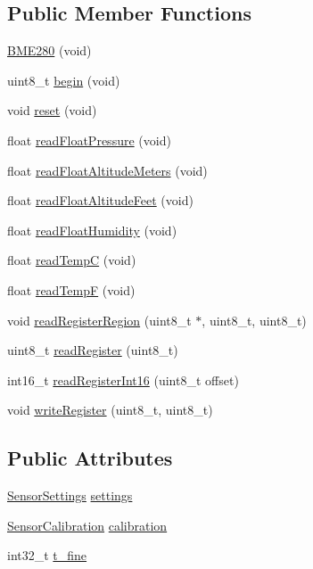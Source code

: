 \subsection*{Public Member Functions}
\begin{DoxyCompactItemize}
\item 
\hyperlink{class_b_m_e280_a9b9354e010528a0c3d452aa2459b808c}{B\+M\+E280} (void)
\item 
uint8\+\_\+t \hyperlink{class_b_m_e280_a994c102f010547f9c740a338ef9905c7}{begin} (void)
\item 
void \hyperlink{class_b_m_e280_aeec5deb6daace6ae390108b4210e9df7}{reset} (void)
\item 
float \hyperlink{class_b_m_e280_ada6e799917afb4f228e6253bc56ffe75}{read\+Float\+Pressure} (void)
\item 
float \hyperlink{class_b_m_e280_af67b56ba50760ee1d116acc6c5010221}{read\+Float\+Altitude\+Meters} (void)
\item 
float \hyperlink{class_b_m_e280_a6525c8a26f887b52596c86bed99343cb}{read\+Float\+Altitude\+Feet} (void)
\item 
float \hyperlink{class_b_m_e280_a42ea7232039eebf5aadb391ef6132c35}{read\+Float\+Humidity} (void)
\item 
float \hyperlink{class_b_m_e280_afffdd1d7ded9e1f92200e70669019d97}{read\+TempC} (void)
\item 
float \hyperlink{class_b_m_e280_a9648b496f6b4700550782a715a98b3c7}{read\+TempF} (void)
\item 
void \hyperlink{class_b_m_e280_aecca87c2c40a7f2bcabcea921bdc6124}{read\+Register\+Region} (uint8\+\_\+t $\ast$, uint8\+\_\+t, uint8\+\_\+t)
\item 
uint8\+\_\+t \hyperlink{class_b_m_e280_a1bbd14c8591966df531e40085342ff71}{read\+Register} (uint8\+\_\+t)
\item 
int16\+\_\+t \hyperlink{class_b_m_e280_ac43c30f9b321d301694094d6b4bebe7e}{read\+Register\+Int16} (uint8\+\_\+t offset)
\item 
void \hyperlink{class_b_m_e280_afcff21c342725246bf415d7f0e4d04f0}{write\+Register} (uint8\+\_\+t, uint8\+\_\+t)
\end{DoxyCompactItemize}
\subsection*{Public Attributes}
\begin{DoxyCompactItemize}
\item 
\hyperlink{struct_sensor_settings}{Sensor\+Settings} \hyperlink{class_b_m_e280_af06253eb2f8ad4b5fabb858bc4a973bf}{settings}
\item 
\hyperlink{struct_sensor_calibration}{Sensor\+Calibration} \hyperlink{class_b_m_e280_aa7a28484b6f5eb6f43261ea25016fbf8}{calibration}
\item 
int32\+\_\+t \hyperlink{class_b_m_e280_ad20f44914b78395f4d4bc64f4a68b369}{t\+\_\+fine}
\end{DoxyCompactItemize}


